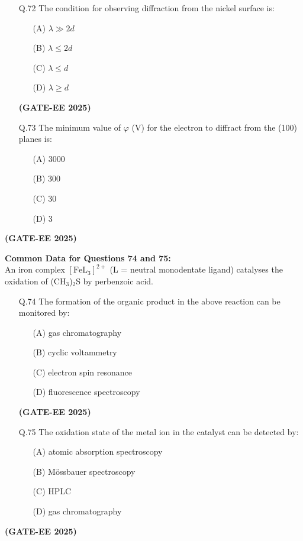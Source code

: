\documentclass[12pt]{article}
\begin{document}
\begin{enumerate}
\begin{itemize}
    \item[Q.72] The condition for observing diffraction from the nickel surface is:
    \begin{enumerate}
        \item[(A)] $\lambda \gg 2d$
        \item[(B)] $\lambda \leq 2d$
        \item[(C)] $\lambda \leq d$
        \item[(D)] $\lambda \geq d$
    \end{enumerate}   \textbf{(GATE-EE 2025)}


    \item[Q.73] The minimum value of $\varphi$ (V) for the electron to diffract from the (100) planes is:
    \begin{enumerate}
        \item[(A)] 3000
        \item[(B)] 300
        \item[(C)] 30
        \item[(D)] 3
    \end{enumerate}
\end{itemize}   \textbf{(GATE-EE 2025)}


\textbf{Common Data for Questions 74 and 75:} \\
An iron complex $[\text{FeL}_3]^{2+}$ (L = neutral monodentate ligand) catalyses the oxidation of (CH$_3$)$_2$S by perbenzoic acid.

\begin{itemize}
    \item[Q.74] The formation of the organic product in the above reaction can be monitored by:
    \begin{enumerate}
        \item[(A)] gas chromatography
        \item[(B)] cyclic voltammetry
        \item[(C)] electron spin resonance
        \item[(D)] fluorescence spectroscopy
    \end{enumerate}   \textbf{(GATE-EE 2025)}


    \item[Q.75] The oxidation state of the metal ion in the catalyst can be detected by:
    \begin{enumerate}
        \item[(A)] atomic absorption spectroscopy
        \item[(B)] M\"ossbauer spectroscopy
        \item[(C)] HPLC
        \item[(D)] gas chromatography
    \end{enumerate}
\end{itemize}   \textbf{(GATE-EE 2025)}



\end{enumerate}
\end{document}
